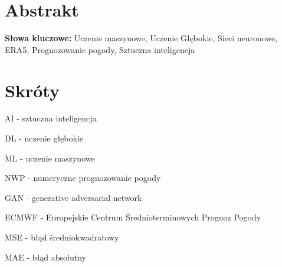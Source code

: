 \documentclass{article}
\begin{document}

\begin{titlepage}
    
\end{titlepage}

\tableofcontents
\pagebreak

\section*{Abstrakt}

\noindent
{\bf Słowa kluczowe:} Uczenie maszynowe, Uczenie Głębokie, Sieci neuronowe,
ERA5, Prognozowanie pogody, Sztuczna inteligencja
\pagebreak










\section*{Skróty}

\raggedright{}

AI - sztuczna inteligencja

DL - uczenie głębokie

ML - uczenie maszynowe

NWP - numeryczne prognozowanie pogody

GAN - generative adversarial network

ECMWF - Europejskie Centrum Średnioterminowych Prognoz Pogody

MSE - błąd średniokwadratowy

MAE - błąd absolutny

\pagebreak
\printbibliography[title={Bibliografia}]

\end{document}
